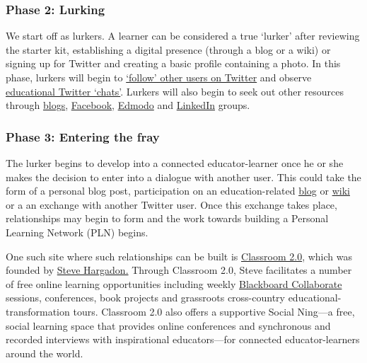 \subsubsection{Phase 2: Lurking}

We start off as lurkers. A learner can be considered a true `lurker'
after reviewing the starter kit, establishing a digital presence
(through a blog or a wiki) or signing up for Twitter and creating a
basic profile containing a photo. In this phase, lurkers will begin to
\href{http://www.google.com/url?q=http\%3A\%2F\%2Fwww.fractuslearning.com\%2F2012\%2F05\%2F25\%2Ftwitter-follow-education-technology\%2F\&sa=D\&sntz=1\&usg=AFQjCNF8grPMuRwU\_ImW9Jk3ZYrg0m9KgQ}{`follow'
other users on Twitter} and observe
\href{http://www.google.com/url?q=http\%3A\%2F\%2Fcybraryman.com\%2Fchats.html\&sa=D\&sntz=1\&usg=AFQjCNFJASZiwfvPbfOzFbHvAunpXfNC1g}{educational
Twitter `chats'}. Lurkers will also begin to seek out other resources
through
\href{http://theinnovativeeducator.blogspot.ca/2012/04/ten-best-education-blogs.html}{blogs},
\href{http://www.google.com/url?q=http\%3A\%2F\%2Fwww.edsocialmedia.com\%2F2011\%2F02\%2Fthe-advantage-of-facebook-groups-in-education\%2F\&sa=D\&sntz=1\&usg=AFQjCNEvc43Q7GqJqS-2S8GhEJ53Ye-j4Q}{Facebook},
\href{http://www.slideshare.net/cmsdsquires/edmodo-for-teachers-guide}{Edmodo}
and
\href{http://www.emergingedtech.com/2012/02/8-great-linkedin-groups-for-educators/}{LinkedIn}
groups.

\subsubsection{Phase 3: Entering the fray}

The lurker begins to develop into a connected educator-learner once he
or she makes the decision to enter into a dialogue with another user.
This could take the form of a personal blog post, participation on an
education-related
\href{http://edudemic.com/2012/08/education-blogs/?utm\_medium=twitter\&utm\_source=twitterfeed}{blog}
or
\href{http://educationalwikis.wikispaces.com/Examples+of+educational+wikis}{wiki}
or a an exchange with another Twitter user. Once this exchange takes
place, relationships may begin to form and the work towards building a
Personal Learning Network (PLN) begins.

One such site where such relationships can be built is
\href{http://www.classroom20.com/}{Classroom 2.0}, which was founded by
\href{http://www.stevehargadon.com/}{Steve Hargadon.} Through Classroom
2.0, Steve facilitates a number of free online learning opportunities
including weekly
\href{http://www.google.com/url?q=http\%3A\%2F\%2Fwww.futureofeducation.com\%2Fnotes\%2FPast\_Interviews\&sa=D\&sntz=1\&usg=AFQjCNHVYOvP-w7NTgKp2Fu2AX4YycnPQQ}{Blackboard
Collaborate} sessions, conferences, book projects and grassroots
cross-country educational-transformation tours. Classroom 2.0 also
offers a supportive Social Ning---a free, social learning space that
provides online conferences and synchronous and recorded interviews with
inspirational educators---for connected educator-learners around the
world.

